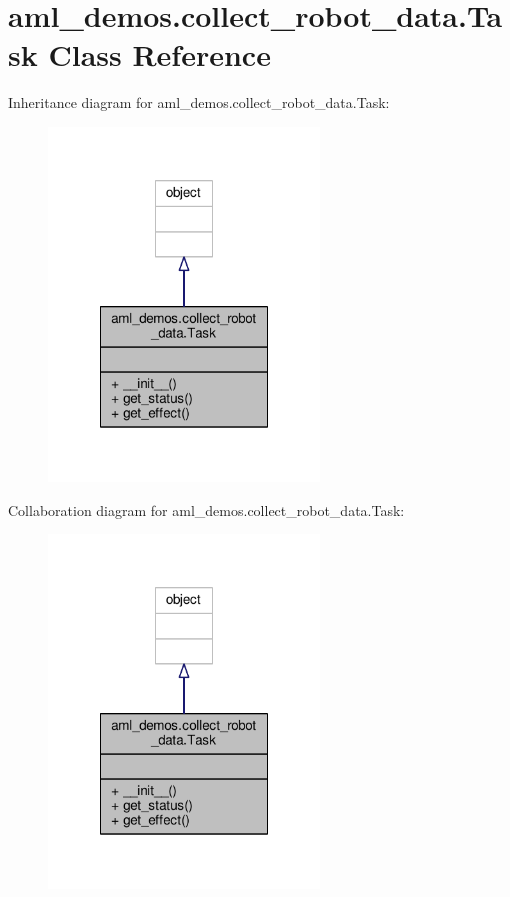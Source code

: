 \hypertarget{classaml__demos_1_1collect__robot__data_1_1_task}{\section{aml\-\_\-demos.\-collect\-\_\-robot\-\_\-data.\-Task Class Reference}
\label{classaml__demos_1_1collect__robot__data_1_1_task}
}


Inheritance diagram for aml\-\_\-demos.\-collect\-\_\-robot\-\_\-data.\-Task\-:
\nopagebreak
\begin{figure}[H]
\begin{center}
\leavevmode
\includegraphics[width=204pt]{classaml__demos_1_1collect__robot__data_1_1_task__inherit__graph}
\end{center}
\end{figure}


Collaboration diagram for aml\-\_\-demos.\-collect\-\_\-robot\-\_\-data.\-Task\-:
\nopagebreak
\begin{figure}[H]
\begin{center}
\leavevmode
\includegraphics[width=204pt]{classaml__demos_1_1collect__robot__data_1_1_task__coll__graph}
\end{center}
\end{figure}
